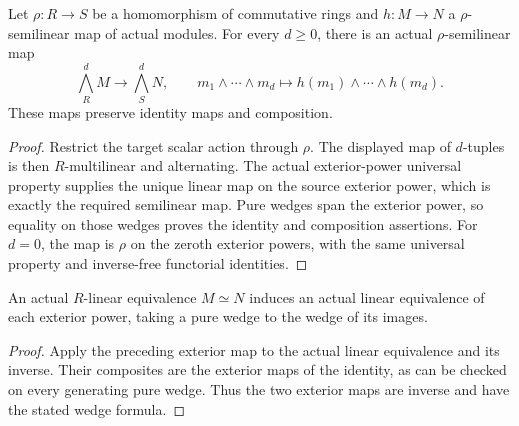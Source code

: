 \begin{lemma}
\label{sc0-canonical-port:ext:semilinear-exterior-map}
\leanok
Let \(\rho:R\to S\) be a homomorphism of commutative rings
and \(h:M\to N\) a \(\rho\)-semilinear map of actual
modules. For every \(d\geq0\), there is an actual
\(\rho\)-semilinear map
\[
 \bigwedge_R^d M\longrightarrow\bigwedge_S^d N,
 \qquad m_1\wedge\cdots\wedge m_d
 \longmapsto h(m_1)\wedge\cdots\wedge h(m_d).
\]
These maps preserve identity maps and composition.
\end{lemma}
\begin{proof}
Restrict the target scalar action through \(\rho\).
The displayed map of \(d\)-tuples is then
\(R\)-multilinear and alternating. The actual exterior-power
universal property supplies the unique linear map on the
source exterior power, which is exactly the required
semilinear map. Pure wedges span the exterior power,
so equality on those wedges proves the identity and
composition assertions. For \(d=0\), the map is
\(\rho\) on the zeroth exterior powers, with the
same universal property and inverse-free functorial identities.
\end{proof}

\begin{lemma}
\label{sc0-canonical-port:ext:linear-exterior-equivalence}
\leanok
An actual \(R\)-linear equivalence \(M\simeq N\)
induces an actual linear equivalence of each exterior
power, taking a pure wedge to the wedge of its images.
\end{lemma}
\begin{proof}
Apply the preceding exterior map to the actual linear
equivalence and its inverse. Their composites are the
exterior maps of the identity, as can be checked on
every generating pure wedge. Thus the two exterior
maps are inverse and have the stated wedge formula.
\end{proof}

